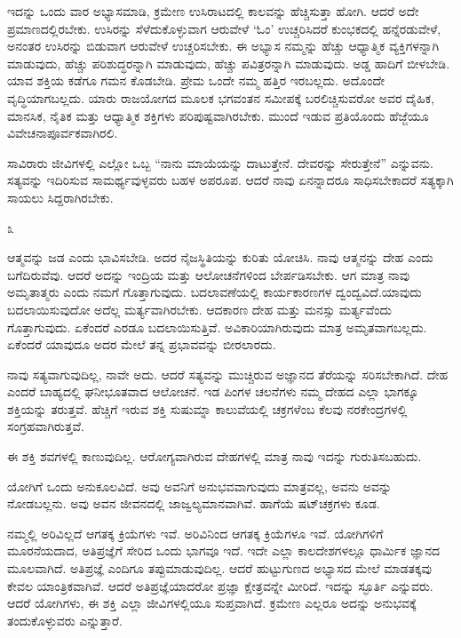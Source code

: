 ಇದನ್ನು ಒಂದು ವಾರ ಅಭ್ಯಾಸಮಾಡಿ, ಕ್ರಮೇಣ ಉಸಿರಾಟದಲ್ಲಿ ಕಾಲವನ್ನು ಹೆಚ್ಚಿಸುತ್ತಾ ಹೋಗಿ. ಆದರೆ ಅದೇ ಪ್ರಮಾಣದಲ್ಲಿರಬೇಕು. ಉಸಿರನ್ನು ಸೆಳೆದುಕೊಳ್ಳುವಾಗ ಆರುವೇಳೆ `ಓಂ' ಉಚ್ಚರಿಸಿದರೆ ಕುಂಭಕದಲ್ಲಿ ಹನ್ನೆರಡುವೇಳೆ, ಅನಂತರ ಉಸಿರನ್ನು ಬಿಡುವಾಗ ಆರುವೇಳೆ ಉಚ್ಚರಿಸಬೇಕು. ಈ ಅಭ್ಯಾಸ ನಮ್ಮನ್ನು ಹೆಚ್ಚು ಆಧ್ಯಾತ್ಮಿಕ ವ್ಯಕ್ತಿಗಳನ್ನಾಗಿ ಮಾಡುವುದು, ಹೆಚ್ಚು ಪರಿಶುದ್ಧರನ್ನಾಗಿ ಮಾಡುವುದು, ಹೆಚ್ಚು ಪವಿತ್ರರನ್ನಾಗಿ ಮಾಡುವುದು. ಅಡ್ಡ ಹಾದಿಗೆ ಬೀಳಬೇಡಿ. ಯಾವ ಶಕ್ತಿಯ ಕಡೆಗೂ ಗಮನ ಕೊಡಬೇಡಿ. ಪ್ರೇಮ ಒಂದೇ ನಮ್ಮ ಹತ್ತಿರ ಇರಬಲ್ಲದು. ಅದೊಂದೇ ವೃದ್ಧಿಯಾಗಬಲ್ಲದು. ಯಾರು ರಾಜಯೋಗದ ಮೂಲಕ ಭಗವಂತನ ಸಮೀಪಕ್ಕೆ ಬರಲಿಚ್ಚಿಸುವರೋ ಅವರ ದೈಹಿಕ, ಮಾನಸಿಕ, ನೈತಿಕ ಮತ್ತು ಆಧ್ಯಾತ್ಮಿಕ ಶಕ್ತಿಗಳು ಪರಿಪುಷ್ಟವಾಗಿರಬೇಕು. ಮುಂದೆ ಇಡುವ ಪ್ರತಿಯೊಂದು ಹೆಜ್ಜೆಯೂ ವಿವೇಚನಾಪೂರ್ವಕವಾಗಿರಲಿ.

ಸಾವಿರಾರು ಜೀವಿಗಳಲ್ಲಿ ಎಲ್ಲೋ ಒಬ್ಬ “ನಾನು ಮಾಯೆಯನ್ನು ದಾಟುತ್ತೇನೆ. ದೇವರನ್ನು ಸೇರುತ್ತೇನೆ'' ಎನ್ನುವನು. ಸತ್ಯವನ್ನು ಇದಿರಿಸುವ ಸಾಮರ್ಥ್ಯವುಳ್ಳವರು ಬಹಳ ಅಪರೂಪ. ಆದರೆ ನಾವು ಏನನ್ನಾದರೂ ಸಾಧಿಸಬೇಕಾದರೆ ಸತ್ಯಕ್ಕಾಗಿ ಸಾಯಲು ಸಿದ್ದರಾಗಿರಬೇಕು.

\begin{center}
೩
\end{center}

ಆತ್ಮವನ್ನು ಜಡ ಎಂದು ಭಾವಿಸಬೇಡಿ. ಅದರ ನೈಜಸ್ಥಿತಿಯನ್ನು ಕುರಿತು ಯೋಚಿಸಿ. ನಾವು ಆತ್ಮನನ್ನು ದೇಹ ಎಂದು ಬಗೆದಿರುವೆವು. ಆದರೆ ಅದನ್ನು ಇಂದ್ರಿಯ ಮತ್ತು ಆಲೋಚನೆಗಳಿಂದ ಬೇರ್ಪಡಿಸಬೇಕು. ಆಗ ಮಾತ್ರ ನಾವು ಅಮೃತಾತ್ಮರು ಎಂದು ನಮಗೆ ಗೊತ್ತಾಗುವುದು. ಬದಲಾವಣೆಯಲ್ಲಿ ಕಾರ್ಯಕಾರಣಗಳ ದ್ವಂದ್ವವಿದೆ.\break ಯಾವುದು ಬದಲಾಯಿಸುವುದೋ ಅದೆಲ್ಲ ಮರ್ತ್ಯವಾಗಿರಬೇಕು. ಆದಕಾರಣ ದೇಹ ಮತ್ತು ಮನಸ್ಸು ಮರ್ತ್ಯವೆಂದು ಗೊತ್ತಾಗುವುದು. ಏಕೆಂದರೆ ಎರಡೂ ಬದಲಾಯಿಸುತ್ತಿವೆ. ಅವಿಕಾರಿಯಾಗಿರುವುದು ಮಾತ್ರ ಅಮೃತವಾಗಬಲ್ಲದು. ಏಕೆಂದರೆ ಯಾವುದೂ ಅದರ ಮೇಲೆ ತನ್ನ ಪ್ರಭಾವವನ್ನು ಬೀರಲಾರದು.

ನಾವು ಸತ್ಯವಾಗುವುದಿಲ್ಲ, ನಾವೇ ಅದು. ಆದರೆ ಸತ್ಯವನ್ನು ಮುಚ್ಚಿರುವ ಅಜ್ಞಾನದ ತೆರೆಯನ್ನು ಸರಿಸಬೇಕಾಗಿದೆ. ದೇಹ ಎಂದರೆ ಬಾಹ್ಯದಲ್ಲಿ ಘನೀಭೂತವಾದ ಆಲೋಚನೆ. ಇಡ ಪಿಂಗಳ ಚಲನೆಗಳು ನಮ್ಮ ದೇಹದ ಎಲ್ಲಾ ಭಾಗಕ್ಕೂ ಶಕ್ತಿಯನ್ನು ತರುತ್ತವೆ. ಹೆಚ್ಚಿಗೆ ಇರುವ ಶಕ್ತಿ ಸುಷುಮ್ನಾ ಕಾಲುವೆಯಲ್ಲಿ ಚಕ್ರಗಳೆಂಬ ಕೆಲವು ನರಕೇಂದ್ರಗಳಲ್ಲಿ ಸಂಗ್ರಹವಾಗಿರುತ್ತವೆ.

ಈ ಶಕ್ತಿ ಶವಗಳಲ್ಲಿ ಕಾಣುವುದಿಲ್ಲ. ಆರೋಗ್ಯವಾಗಿರುವ ದೇಹಗಳಲ್ಲಿ ಮಾತ್ರ ನಾವು ಇದನ್ನು ಗುರುತಿಸಬಹುದು.

ಯೋಗಿಗೆ ಒಂದು ಅನುಕೂಲವಿದೆ. ಅವು ಅವನಿಗೆ ಅನುಭವವಾಗುವುದು ಮಾತ್ರವಲ್ಲ, ಅವನು ಅವನ್ನು ನೋಡಬಲ್ಲನು. ಅವು ಅವನ ಜೀವನದಲ್ಲಿ ಜಾಜ್ವಲ್ಯಮಾನವಾಗಿವೆ. ಹಾಗೆಯೆ ಷಟ್‌ಚಕ್ರಗಳು ಕೂಡ.

ನಮ್ಮಲ್ಲಿ ಅರಿವಿಲ್ಲದೆ ಆಗತಕ್ಕ ಕ್ರಿಯೆಗಳು ಇವೆ. ಅರಿವಿನಿಂದ ಆಗತಕ್ಕ ಕ್ರಿಯೆಗಳೂ ಇವೆ. ಯೋಗಿಗಳಿಗೆ ಮೂರನೆಯದಾದ, ಅತಿಪ್ರಜ್ಞೆಗೆ ಸೇರಿದ ಒಂದು ಭಾಗವೂ ಇದೆ. ಇದೇ ಎಲ್ಲಾ ಕಾಲದೇಶಗಳಲ್ಲೂ ಧಾರ್ಮಿಕ ಜ್ಞಾನದ ಮೂಲವಾಗಿದೆ. ಅತಿಪ್ರಜ್ಞೆ ಎಂದಿಗೂ ತಪ್ಪುಮಾಡುವುದಿಲ್ಲ. ಆದರೆ ಹುಟ್ಟುಗುಣದ ಅಭ್ಯಾಸದ ಮೇಲೆ ಮಾಡತಕ್ಕವು ಕೇವಲ ಯಾಂತ್ರಿಕವಾಗಿವೆ. ಆದರೆ ಅತಿಪ್ರಜ್ಞೆಯಾದರೋ ಪ್ರಜ್ಞಾ ಕ್ಷೇತ್ರವನ್ನೇ ಮೀರಿದೆ. ಇದನ್ನು ಸ್ಫೂರ್ತಿ ಎನ್ನುವರು. ಆದರೆ ಯೋಗಿಗಳು, ಈ ಶಕ್ತಿ ಎಲ್ಲಾ ಜೀವಿಗಳಲ್ಲಿಯೂ ಸುಪ್ತವಾಗಿದೆ. ಕ್ರಮೇಣ ಎಲ್ಲರೂ ಅದನ್ನು ಅನುಭವಕ್ಕೆ ತಂದುಕೊಳ್ಳುವರು ಎನ್ನುತ್ತಾರೆ.

